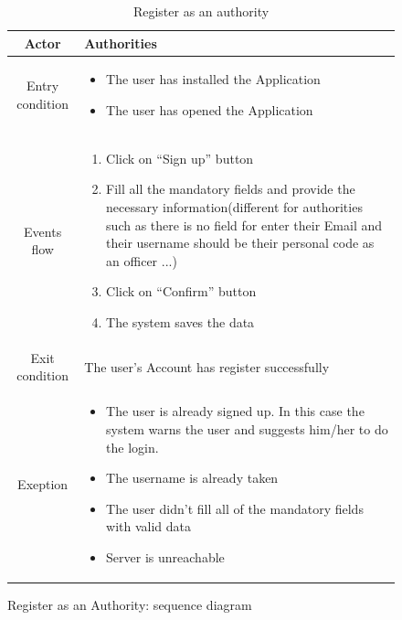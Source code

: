 \documentclass{article}
\begin{document}
	\begin{figure}
		\begin{table} [H]
		\begin{center}
		\caption{Register as an authority}
		\begin{tabular}{|c|p{8cm}|}
			\hline
			Actor			&	Authorities\\
			\hline
			Entry condition	&	\begin{itemize}[noitemsep,topsep=0pt]
									\item The user has installed the Application
									\item The user has opened the Application
								\end{itemize}\\
			\hline
			Events flow		&	\begin{enumerate}[noitemsep,topsep=0pt]
									\item Click on “Sign up” button
									\item Fill all the mandatory fields and provide the
									 necessary information(different for authorities such as
									  there is no field for enter their Email and their 
									  username should be their personal code as an officer ...)
									\item Click on “Confirm” button
									\item The system saves the data
								\end{enumerate}\\
			\hline
			Exit condition	&	The user's Account has register successfully\\
			\hline
			Exeption			& 	\begin{itemize}[noitemsep,topsep=0pt]
									\item The user is already signed up. In this case the
									 system warns the user and suggests him/her to do the
									  login.
									\item The username is already taken
									\item The user didn’t fill all of the mandatory 
									fields with valid data
									\item Server is unreachable
								\end{itemize}\\
			\hline
		\end{tabular}
		\end{center}
		\end{table} 
		
		\centering
		\def\svgwidth{\columnwidth}
		
		\caption{Register as an Authority: sequence diagram}
	\end{figure}
	
\end{document}
